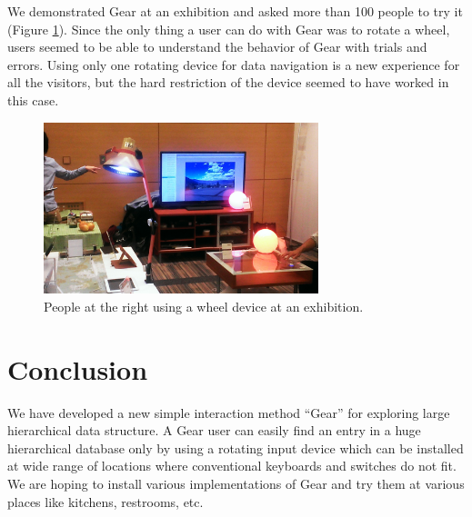 \documentclass[conference]{IEEEtran}
\begin{document}
We demonstrated Gear at an exhibition
and asked more than 100 people to try it
(Figure \ref{exhibition}).
%
Since the only thing a user can do with Gear was to rotate a wheel,
users seemed to be able to understand the behavior of Gear with trials and errors.
% 
% 
Using only one rotating device for data navigation is a new experience for
all the visitors, but the hard restriction of the device seemed to have worked in this case.

\begin{figure}[H]
\centerline{\includegraphics[width=80mm,bb=0 0 527 329]{figures/c520d5dfbd06c532d48d324a7019b00c.png}}
\caption{People at the right using a wheel device at an exhibition.}
\label{exhibition}
\end{figure}


\section{Conclusion}

We have developed a new simple interaction method ``Gear'' for exploring
large hierarchical data structure.
A Gear user can easily find an entry in a huge hierarchical database
only by using a rotating input device which can be installed at
wide range of locations where conventional keyboards and switches do not fit.
We are hoping to install various implementations of Gear and try them at
various places like kitchens, restrooms, etc.

\small{


}
\end{document}
